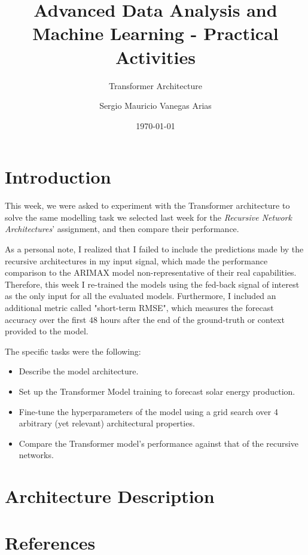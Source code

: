 \documentclass{scrartcl}
\title{Advanced Data Analysis and Machine Learning - Practical Activities}
\subtitle{Transformer Architecture}
\author{Sergio Mauricio Vanegas Arias}
\date{\today}
\begin{document}
  \maketitle

  \section{Introduction}

    This week, we were asked to experiment with the Transformer architecture\cite{vaswani2023attention} to solve the same modelling task we selected last week for the \emph{Recursive Network Architectures}' assignment, and then compare their performance.

    As a personal note, I realized that I failed to include the predictions made by the recursive architectures in my input signal, which made the performance comparison to the ARIMAX model non-representative of their real capabilities. Therefore, this week I re-trained the models using the fed-back signal of interest as the only input for all the evaluated models. Furthermore, I included an additional metric called "short-term RMSE", which measures the forecast accuracy over the first $48$ hours after the end of the ground-truth or context provided to the model.

    The specific tasks were the following:
    \begin{itemize}
      \item Describe the model architecture.
      \item Set up the Transformer Model training to forecast solar energy production.
      \item Fine-tune the hyperparameters of the model using a grid search over 4 arbitrary (yet relevant) architectural properties.
      \item Compare the Transformer model's performance against that of the recursive networks.
    \end{itemize}

  \section{Architecture Description}

    

  \section*{References}

    \printbibliography
\end{document}
